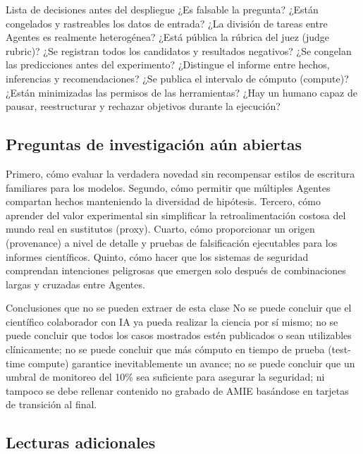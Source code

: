 \begin{knowledgebox}{Lista de decisiones antes del despliegue}
¿Es falsable la pregunta? ¿Están congelados y rastreables los datos de entrada? ¿La división de tareas entre Agentes es realmente heterogénea? ¿Está pública la rúbrica del juez (judge rubric)? ¿Se registran todos los candidatos y resultados negativos? ¿Se congelan las predicciones antes del experimento? ¿Distingue el informe entre hechos, inferencias y recomendaciones? ¿Se publica el intervalo de cómputo (compute)? ¿Están minimizadas las permisos de las herramientas? ¿Hay un humano capaz de pausar, reestructurar y rechazar objetivos durante la ejecución?
\end{knowledgebox}

\subsection{Preguntas de investigación aún abiertas}

Primero, cómo evaluar la verdadera novedad sin recompensar estilos de escritura familiares para los modelos. Segundo, cómo permitir que múltiples Agentes compartan hechos manteniendo la diversidad de hipótesis. Tercero, cómo aprender del valor experimental sin simplificar la retroalimentación costosa del mundo real en sustitutos (proxy). Cuarto, cómo proporcionar un origen (provenance) a nivel de detalle y pruebas de falsificación ejecutables para los informes científicos. Quinto, cómo hacer que los sistemas de seguridad comprendan intenciones peligrosas que emergen solo después de combinaciones largas y cruzadas entre Agentes.

\begin{warningbox}{Conclusiones que no se pueden extraer de esta clase}
No se puede concluir que el científico colaborador con IA ya pueda realizar la ciencia por sí mismo; no se puede concluir que todos los casos mostrados estén publicados o sean utilizables clínicamente; no se puede concluir que más cómputo en tiempo de prueba (test-time compute) garantice inevitablemente un avance; no se puede concluir que un umbral de monitoreo del 10\% sea suficiente para asegurar la seguridad; ni tampoco se debe rellenar contenido no grabado de AMIE basándose en tarjetas de transición al final.
\end{warningbox}

\subsection{Lecturas adicionales}


